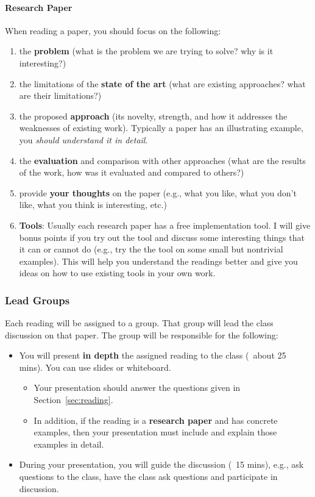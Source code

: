 \documentclass[11pt]{article}
\begin{document}
\paragraph{Research Paper} When reading a paper, you should focus on the following: 
\begin{enumerate}
    \item the \textbf{problem} (what is the problem we are trying to solve? why is it interesting?)
    \item the limitations of the \textbf{state of the art} (what are existing approaches? what are their limitations?)
    \item the proposed \textbf{approach} (its novelty, strength, and how it  addresses the weaknesses of  existing work). Typically a paper has an illustrating example, you \emph{should understand it in detail}.
    \item the \textbf{evaluation} and comparison with other approaches (what are the results of the work, how was it evaluated and compared to others?)
    \item provide \textbf{your thoughts} on the paper (e.g., what you like, what you don't like, what you think is interesting, etc.)
    \item \textbf{\textbf{Tools}}: Usually each research paper has a free implementation
tool. I will give bonus points if you try out the
tool and discuss some interesting things that it can or cannot do
(e.g., try the the tool on some small but nontrivial examples). This
will help you understand the readings better and give you ideas on
how to use existing tools in your own work.
\end{enumerate}
    
\subsubsection{Lead Groups} Each reading will be assigned to a group.  That group will lead the class discussion on that paper. The group will be responsible for the following:
\begin{itemize}
\item You will present \textbf{\textbf{in depth}} the assigned reading to the class (~about 25 mins). You can use slides or whiteboard.
\begin{itemize}
    \item Your presentation should answer the questions given in Section~\ref{sec:reading}.
    \item In addition, if the reading is a \textbf{research paper} and has concrete examples, then your presentation must include and explain those examples in detail.
\end{itemize}
\item During your presentation, you will guide the discussion (~15 mins), e.g., ask questions to the class, have the class ask questions and participate in discussion.


\end{itemize}
\end{document}
